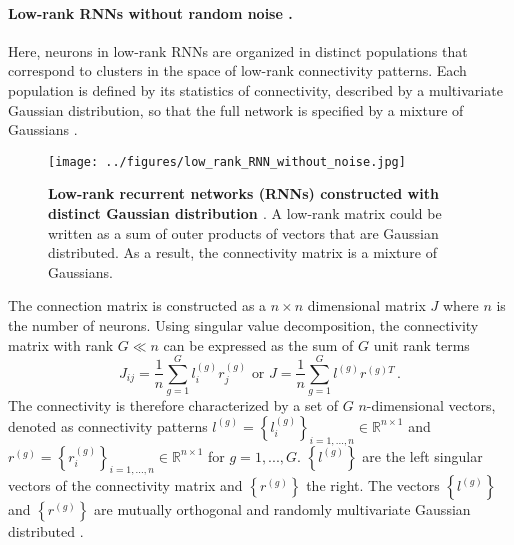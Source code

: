 \documentclass[11pt]{article}
\begin{document}
	\paragraph{Low-rank RNNs without random noise \cite{beiran2021shaping, dubreuil2022role}.}
	Here, neurons in low-rank RNNs are organized in distinct populations that correspond to clusters in the space of low-rank connectivity patterns. Each population is defined by its statistics of connectivity, described by a multivariate Gaussian distribution, so that the full network is specified by a mixture of Gaussians \cite{beiran2021shaping}.
		\vspace{-0.2cm}
		\begin{figure}[H]
			\centering
			\texttt{[image: ../figures/low\_rank\_RNN\_without\_noise.jpg]}
			\caption[Low-rank recurrent networks (RNNs) constructed with distinct Gaussian distribution]{\textbf{Low-rank recurrent networks (RNNs) constructed with distinct Gaussian distribution \cite{beiran2023parametric}}. A low-rank matrix could be written as a sum of outer products of vectors that are Gaussian distributed. As a result, the connectivity matrix is a mixture of Gaussians. }
			\label{fig:low_rank_RNN_without_noise}
		\end{figure}
	The connection matrix is constructed as a $n \times n$ dimensional matrix $J$ where $n$ is the number of neurons. Using singular value decomposition, the connectivity matrix with rank $G \ll n$ can be expressed as the sum of $G$ unit rank terms
		\begin{equation} \label{eq:low_rank_RNN_without_noise}
			J_{ij} = \frac{1}{n}\sum_{g = 1}^{G} l_i^{(g)}r_j^{(g)} \, \, \text{or} \, \, J = \frac{1}{n} \sum_{g=1}^{G} l^{(g)} r^{(g)T} \, . 
		\end{equation}
	The connectivity is therefore characterized by a set of $G$ $n$-dimensional vectors, denoted as connectivity patterns $l^{(g)} = \left\{l_i^{(g)}\right\}_{i = 1, ..., n } \in \mathbb{R}^{n \times 1}$ and $r^{(g)} = \left\{r_i^{(g)}\right\}_{i = 1, ..., n } \in \mathbb{R}^{n \times 1}$ for $g = 1, ..., G$. $\left\{l^{(g)}\right\}$ are the left singular vectors of the connectivity matrix and $\left\{r^{(g)}\right\}$ the right. The vectors $\left\{l^{(g)}\right\}$ and $\left\{r^{(g)}\right\}$ are mutually orthogonal and randomly multivariate Gaussian distributed \cite{beiran2021shaping}. 
	
\end{document}
